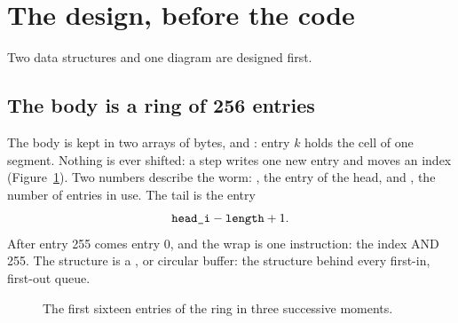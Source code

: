 \section{The design, before the code}

Two data structures and one diagram are designed first.

\subsection{The body is a ring of 256 entries}

The body is kept in two arrays of bytes,  and :
entry $k$ holds the cell of one segment. Nothing is ever shifted: a step
writes one new entry and moves an index (Figure~\ref{fig:v3:ring}). Two
numbers describe the worm: , the entry of the head, and
, the number of entries in use. The tail is the entry
\[ \texttt{head\_i}-\texttt{length}+1 . \]
After entry 255 comes entry 0, and the wrap is one instruction: the index AND
255. The structure is a , or circular buffer: the structure
behind every first-in, first-out queue.

\begin{figure}[htb]
\centering
{}
\caption{The first sixteen entries of the ring in three successive moments.}
\label{fig:v3:ring}
\end{figure}

